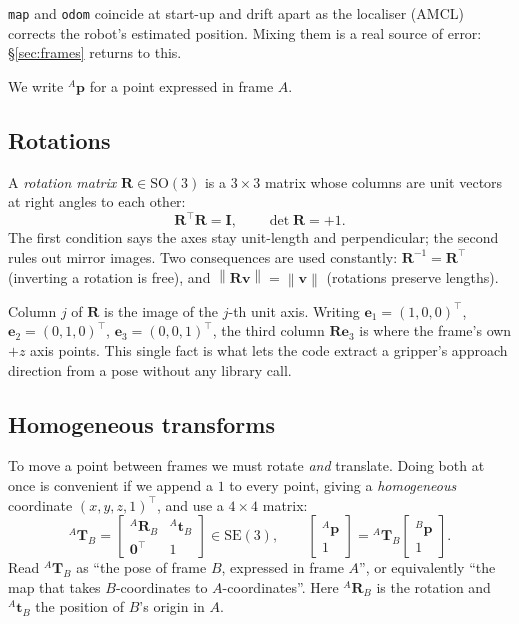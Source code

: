 \documentclass[11pt,a4paper]{article}
\newcommand{\SO}{\mathrm{SO}}
\newcommand{\SE}{\mathrm{SE}}
\newcommand{\norm}[1]{\left\lVert #1 \right\rVert}
\newcommand{\Tf}[2]{{}^{#1}\mathbf{T}_{#2}}
\newcommand{\Rot}[2]{{}^{#1}\mathbf{R}_{#2}}
\begin{document}
\texttt{map} and \texttt{odom} coincide at start-up and drift apart as the
localiser (AMCL) corrects the robot's estimated position. Mixing them is a real
source of error: \S\ref{sec:frames} returns to this.

We write ${}^{A}\mathbf{p}$ for a point expressed in frame $A$.

\subsection{Rotations}

A \emph{rotation matrix} $\mathbf{R} \in \SO(3)$ is a $3\times3$ matrix whose
columns are unit vectors at right angles to each other:
\begin{equation}
\mathbf{R}^\top \mathbf{R} = \mathbf{I}, \qquad \det \mathbf{R} = +1 .
\end{equation}
The first condition says the axes stay unit-length and perpendicular; the second
rules out mirror images. Two consequences are used constantly:
$\mathbf{R}^{-1} = \mathbf{R}^\top$ (inverting a rotation is free), and
$\norm{\mathbf{R}\mathbf{v}} = \norm{\mathbf{v}}$ (rotations preserve lengths).

Column $j$ of $\mathbf{R}$ is the image of the $j$-th unit axis. Writing
$\mathbf{e}_1=(1,0,0)^\top$, $\mathbf{e}_2=(0,1,0)^\top$,
$\mathbf{e}_3=(0,0,1)^\top$, the third column $\mathbf{R}\mathbf{e}_3$ is where
the frame's own $+z$ axis points. This single fact is what lets the code extract
a gripper's approach direction from a pose without any library call.

\subsection{Homogeneous transforms}

To move a point between frames we must rotate \emph{and} translate. Doing both at
once is convenient if we append a $1$ to every point, giving a
\emph{homogeneous} coordinate $(x,y,z,1)^\top$, and use a $4\times4$ matrix:
\begin{equation}
\Tf{A}{B} =
\begin{bmatrix}
\Rot{A}{B} & {}^{A}\mathbf{t}_{B} \\
\mathbf{0}^\top & 1
\end{bmatrix} \in \SE(3),
\qquad
\begin{bmatrix} {}^{A}\mathbf{p} \\ 1 \end{bmatrix}
= \Tf{A}{B}
\begin{bmatrix} {}^{B}\mathbf{p} \\ 1 \end{bmatrix}.
\label{eq:homog}
\end{equation}
Read $\Tf{A}{B}$ as ``the pose of frame $B$, expressed in frame $A$'', or
equivalently ``the map that takes $B$-coordinates to $A$-coordinates''. Here
$\Rot{A}{B}$ is the rotation and ${}^{A}\mathbf{t}_{B}$ the position of $B$'s
origin in $A$.
\end{document}

